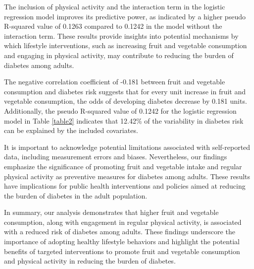 \documentclass[12pt]{article}
\begin{document}
The inclusion of physical activity and the interaction term in the logistic regression model improves its predictive power, as indicated by a higher pseudo R-squared value of 0.1263 compared to 0.1242 in the model without the interaction term. These results provide insights into potential mechanisms by which lifestyle interventions, such as increasing fruit and vegetable consumption and engaging in physical activity, may contribute to reducing the burden of diabetes among adults.

The negative correlation coefficient of -0.181 between fruit and vegetable consumption and diabetes risk suggests that for every unit increase in fruit and vegetable consumption, the odds of developing diabetes decrease by 0.181 units. Additionally, the pseudo R-squared value of 0.1242 for the logistic regression model in Table \ref{table2} indicates that 12.42\% of the variability in diabetes risk can be explained by the included covariates.

It is important to acknowledge potential limitations associated with self-reported data, including measurement errors and biases. Nevertheless, our findings emphasize the significance of promoting fruit and vegetable intake and regular physical activity as preventive measures for diabetes among adults. These results have implications for public health interventions and policies aimed at reducing the burden of diabetes in the adult population.

In summary, our analysis demonstrates that higher fruit and vegetable consumption, along with engagement in regular physical activity, is associated with a reduced risk of diabetes among adults. These findings underscore the importance of adopting healthy lifestyle behaviors and highlight the potential benefits of targeted interventions to promote fruit and vegetable consumption and physical activity in reducing the burden of diabetes.
\end{document}
